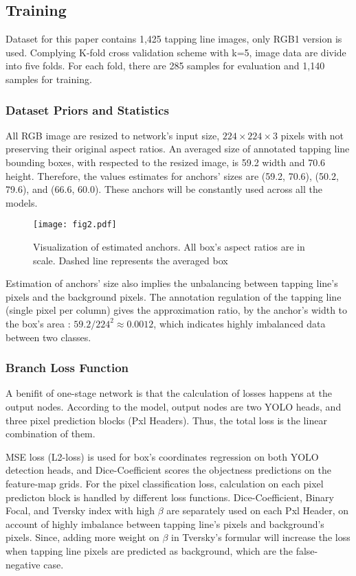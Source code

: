 \documentclass[default,pdflatex,iicol]{sn-jnl}%
\begin{document}
\subsection{Training}
Dataset for this paper contains 1,425 tapping line images, only RGB1 version \cite{Wongtanawijit_2021} is used. Complying K-fold cross validation scheme with k=5, image data are divide into five folds. For each fold, there are 285 samples for evaluation and 1,140 samples for training.

\subsubsection{Dataset Priors and Statistics}
All RGB image are resized to network's input size, $224\times224\times3$ pixels with not preserving their original aspect ratios. An averaged size of annotated tapping line bounding boxes, with respected to the resized image, is 59.2 width and 70.6 height. Therefore, the values estimates for anchors' sizes are (59.2, 70.6), (50.2, 79.6), and (66.6, 60.0). These anchors will be constantly used across all the models.

\begin{figure}[h]%
\centering
\texttt{[image: fig2.pdf]}
\caption{Visualization of estimated anchors. All box's aspect ratios are in scale. Dashed line represents the averaged box}\label{fig2-anchors}
\end{figure}

Estimation of anchors' size also implies the unbalancing between tapping line's pixels and the background pixels. The annotation regulation of the tapping line (single pixel per column) gives the approximation ratio, by the anchor's width to the box's area : $59.2 / 224^2 \approx 0.0012$, which indicates highly imbalanced data between two classes.

\subsubsection{Branch Loss Function}
A benifit of one-stage network is that the calculation of losses happens at the output nodes. According to the model, output nodes are two YOLO heads, and three pixel prediction blocks (Pxl Headers). Thus, the total loss is the linear combination of them.

MSE loss (L2-loss) is used for box's coordinates regression on both YOLO detection heads, and Dice-Coefficient scores the objectness predictions on the feature-map grids. For the pixel classification loss, calculation on each pixel predicton block is handled by different loss functions. Dice-Coefficient, Binary Focal, and Tversky index with high $\beta$  are separately used on each Pxl Header, on account of highly imbalance between tapping line's pixels and background's pixels. Since, adding more weight on $\beta$ in Tversky's formular \cite{tverskyloss} will increase the loss when tapping line pixels are predicted as background, which are the false-negative case.
\end{document}
